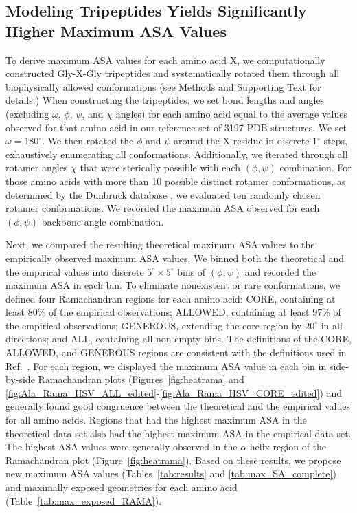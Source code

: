 \documentclass[11pt]{article}
\begin{document}
\subsection*{Modeling Tripeptides Yields Significantly Higher Maximum ASA Values}
To derive maximum ASA values for each amino acid X, we computationally constructed Gly-X-Gly tripeptides and systematically rotated them through all biophysically allowed  conformations (see Methods and Supporting Text for details.) When constructing the tripeptides, we set bond lengths and angles (excluding $\omega$, $\phi$, $\psi$, and $\chi$ angles) for each amino acid equal to the average values observed for that amino acid in our reference set of 3197 PDB structures. We set $\omega=180^\circ$. We then rotated the $\phi$ and $\psi$ around the X residue in  discrete 1$^\circ$ steps, exhaustively enumerating all conformations. Additionally, we iterated through all rotamer angles $\chi$ that were sterically possible with each $(\phi, \psi)$ combination. For those amino acids with more than 10 possible distinct rotamer conformations, as determined by the Dunbruck database \cite{WangDunbrack2003}, we evaluated ten randomly chosen rotamer conformations. We recorded the maximum ASA observed for each $(\phi, \psi)$ backbone-angle combination.

Next, we compared the resulting theoretical maximum ASA values to the empirically observed maximum ASA values. We binned both the theoretical and the empirical values into discrete $5^\circ\times5^\circ$ bins of $(\phi, \psi)$ and recorded the maximum ASA in each bin. To eliminate nonexistent or rare conformations, we defined four Ramachandran regions for each amino acid: CORE, containing at least 80\% of the empirical observations; ALLOWED, containing at least 97\% of the empirical observations; GENEROUS, extending the core region by $20^\circ$ in all directions; and ALL, containing all non-empty bins. The definitions of the CORE, ALLOWED, and GENEROUS regions are consistent with the definitions used in Ref.~\cite{Morrisetal1992}. For each region, we displayed the maximum ASA value in each bin in side-by-side Ramachandran plots (Figures~\ref{fig:heatrama} and \ref{fig:Ala_Rama_HSV_ALL_edited}-\ref{fig:Ala_Rama_HSV_CORE_edited}) and generally found good congruence between the theoretical and the empirical values for all amino acids. Regions that had the highest maximum ASA in the theoretical data set also had the highest maximum ASA in the empirical data set. The highest ASA values were generally observed in the $\alpha$-helix region of the Ramachandran plot (Figure~\ref{fig:heatrama}). Based on these results, we propose new maximum ASA values (Tables~\ref{tab:results} and \ref{tab:max_SA_complete}) and maximally exposed geometries for each amino acid (Table~\ref{tab:max_exposed_RAMA}).
\end{document}
